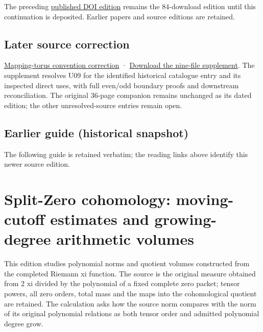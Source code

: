 \documentclass[
]{article}
\begin{document}
The preceding \href{https://zenodo.org/records/22803503}{published DOI
edition} remains the 84-download edition until this continuation is
deposited. Earlier papers and source editions are retained.

\subsection{Later source correction}\label{later-source-correction-1}

\href{https://github.com/KokunoYumeto/zeta-function-research-reader/blob/main/workbenches/splitzero-tandem/source-corrections/20260917-mapping-torus-conventions/README.md}{Mapping-torus
convention correction} ·
\href{https://raw.githubusercontent.com/KokunoYumeto/zeta-function-research-reader/main/workbenches/splitzero-tandem/source-corrections/20260917-mapping-torus-conventions/mapping-torus-convention-addendum-2026-09-17.zip}{Download
the nine-file supplement}. The supplement resolves U09 for the
identified historical catalogue entry and its inspected direct uses,
with full even/odd boundary proofs and downstream reconciliation. The
original 36-page companion remains unchanged as its dated edition; the
other unresolved-source entries remain open.

\subsection{Earlier guide (historical
snapshot)}\label{earlier-guide-historical-snapshot-6}

The following guide is retained verbatim; the reading links above
identify this newer source edition.

\section{Split-Zero cohomology: moving-cutoff estimates and
growing-degree arithmetic
volumes}\label{split-zero-cohomology-moving-cutoff-estimates-and-growing-degree-arithmetic-volumes}

This edition studies polynomial norms and quotient volumes constructed
from the completed Riemann xi function. The source is the original
measure obtained from 2 xi divided by the polynomial of a fixed complete
zero packet; tensor powers, all zero orders, total mass and the maps
into the cohomological quotient are retained. The calculation asks how
the source norm compares with the norm of its original polynomial
relations as both tensor order and admitted polynomial degree grow.
\end{document}

